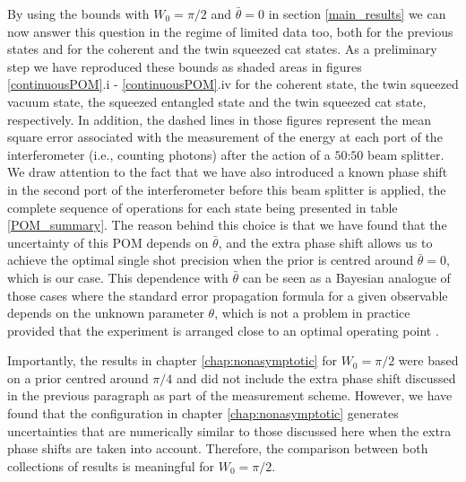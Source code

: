 By using the bounds with $W_0=\pi/2$ and $\bar{\theta} = 0$ in section \ref{main_results} we can now answer this question in the regime of limited data too, both for the previous states and for the coherent and the twin squeezed cat states. As a preliminary step we have reproduced these bounds as shaded areas in figures \ref{continuousPOM}.i - \ref{continuousPOM}.iv for the coherent state, the twin squeezed vacuum state, the squeezed entangled state and the twin squeezed cat state, respectively. In addition, the dashed lines in those figures represent the mean square error associated with the measurement of the energy at each port of the interferometer (i.e., counting photons) after the action of a $50$:$50$ beam splitter. We draw attention to the fact that we have also introduced a known phase shift in the second port of the interferometer before this beam splitter is applied, the complete sequence of operations for each state being presented in table \ref{POM_summary}. The reason behind this choice is that we have found that the uncertainty of this POM depends on $\bar{\theta}$, and the extra phase shift allows us to achieve the optimal single shot precision when the prior is centred around $\bar{\theta} = 0$, which is our case. This dependence with $\bar{\theta}$ can be seen as a Bayesian analogue of those cases where the standard error propagation formula for a given observable depends on the unknown parameter $\theta$, which is not a problem in practice provided that the experiment is arranged close to an optimal operating point \cite{rafal2015}.

Importantly, the results in chapter \ref{chap:nonasymptotic} for $W_0=\pi/2$ were based on a prior centred around $\pi/4$ and did not include the extra phase shift discussed in the previous paragraph as part of the measurement scheme. However, we have found that the configuration in chapter \ref{chap:nonasymptotic} generates uncertainties that are numerically similar to those discussed here when the extra phase shifts are taken into account. Therefore, the comparison between both collections of results is meaningful for $W_0=\pi/2$.

